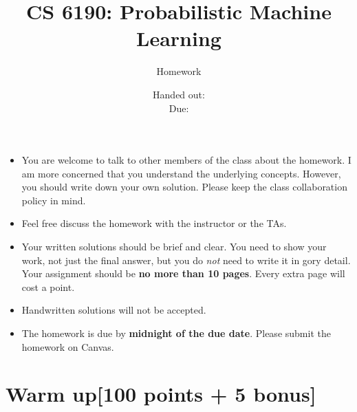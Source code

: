 \documentclass[12pt, fullpage,letterpaper]{article}
\title{CS 6190: Probabilistic Machine Learning \semester}
\author{Homework \assignmentId}
\date{Handed out: \releaseDate\\
  Due: \dueDate}
\begin{document}
\maketitle


\footnotesize
	\begin{itemize}
		\item You are welcome to talk to other members of the class about
		the homework. I am more concerned that you understand the
		underlying concepts. However, you should write down your own
		solution. Please keep the class collaboration policy in mind.
		
		\item Feel free discuss the homework with the instructor or the TAs.
		
		\item Your written solutions should be brief and clear. You need to
		show your work, not just the final answer, but you do \emph{not}
		need to write it in gory detail. Your assignment should be {\bf no
			more than 10 pages}. Every extra page will cost a point.
		
		\item Handwritten solutions will not be accepted.
		
		\item The homework is due by \textbf{midnight of the due date}. Please submit
		the homework on Canvas.
	\end{itemize}



\section*{Warm up[100 points + 5 bonus]}	
\label{sec:q1}
\end{document}

